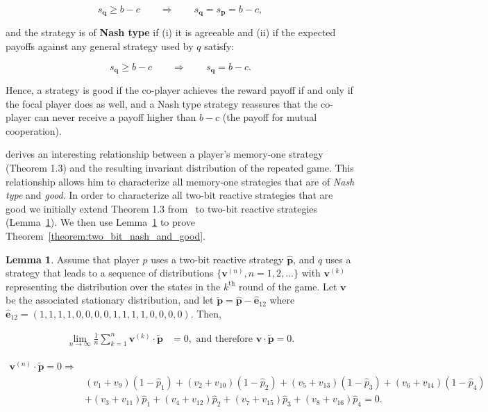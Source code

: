 \documentclass{article}
\theoremstyle{definition}
\newtheorem{lemma}[theorem]{Lemma}
\begin{document}
\begin{equation}
    s_{\mathbf{q}} \geq b\!-\!c \qquad \Rightarrow \qquad s_{\mathbf{q}} = s_{\mathbf{p}} =  b\!-\!c,
\end{equation}

and the strategy is of \textbf{Nash type} if (i) it is agreeable and (ii)
if the expected payoffs against any general strategy used by \(q\) satisfy:

\begin{equation}
    s_{\mathbf{q}} \geq b\!-\!c \qquad \Rightarrow \qquad s_{\mathbf{q}} =  b\!-\!c.
\end{equation}

Hence, a strategy is good if the co-player achieves the reward payoff if and
only if the focal player does as well, and a Nash type strategy reassures that
the co-player can never receive a payoff higher than \(b\!-\!c\) (the payoff for
mutual cooperation).

\citep{akin:EGADS:2016} derives an interesting relationship between a player's
memory-one strategy (Theorem 1.3) and the resulting invariant distribution of the repeated
game. This relationship allows him to characterize all memory-one strategies
that are of \textit{Nash type} and \textit{good}. In order to characterize all two-bit reactive strategies that are good we
initially extend Theorem 1.3 from~\citep{akin:EGADS:2016} to two-bit reactive
strategies (Lemma~\ref{lemma:akin_extended}). 
We then use Lemma~\ref{lemma:akin_extended} to prove
Theorem~\ref{theorem:two_bit_nash_and_good}.

\begin{lemma}\label{lemma:akin_extended}
  Assume that player \(p\) uses a two-bit reactive strategy \(\mathbf{\hat{p}}\),
  and \(q\) uses a strategy that leads to a sequence
  of distributions \(\{\mathbf{v}^{(n)}, n = 1, 2, ...\}\) with
  \(\mathbf{v}^{(k)}\) representing the distribution over the states in the
  \(k^{\text{th}}\) round of the game. Let \(\mathbf{v}\) be the associated
  stationary distribution, and let \(\mathbf{\tilde{p}} = \mathbf{\hat{p}} - \mathbf{\hat{e}}_{1 2}\)
  where \(\mathbf{\hat{e}}_{1 2} = (1, 1, 1, 1, \allowbreak 0,
  0, 0, 0, 1, 1, 1, 1, 0, 0, 0, 0)\). Then,

  \begin{align*}
    \lim_{n \rightarrow \infty} \frac{1}{n} \sum_{k=1}^{n} \mathbf{v}^{(k)} \cdot\mathbf{\tilde{p}} & = 0, \text{ and therefore } \mathbf{v} \cdot \mathbf{\tilde{p}} = 0.
  \end{align*}

  \begin{align}\label{eq:akin_extended}
  \mathbf{v}^{(n)} \cdot \mathbf{\tilde{p}} = 0 \Rightarrow & \nonumber \\
  & (v_{1} + v_{9}) (1 - \hat{p}_1) + (v_{2} + v_{10}) (1 - \hat{p}_2)  + (v_{5} + v_{13}) (1 - \hat{p}_3) + (v_{6} + v_{14}) (1 - \hat{p}_4) \nonumber \\
  & + (v_{3} + v_{11})\hat{p}_1  + (v_{4} + v_{12})\hat{p}_2 + (v_{7} + v_{15}) \hat{p}_3 + (v_{8} + v_{16}) \hat{p}_4 = 0.
  \end{align}
\end{lemma}
\end{document}
